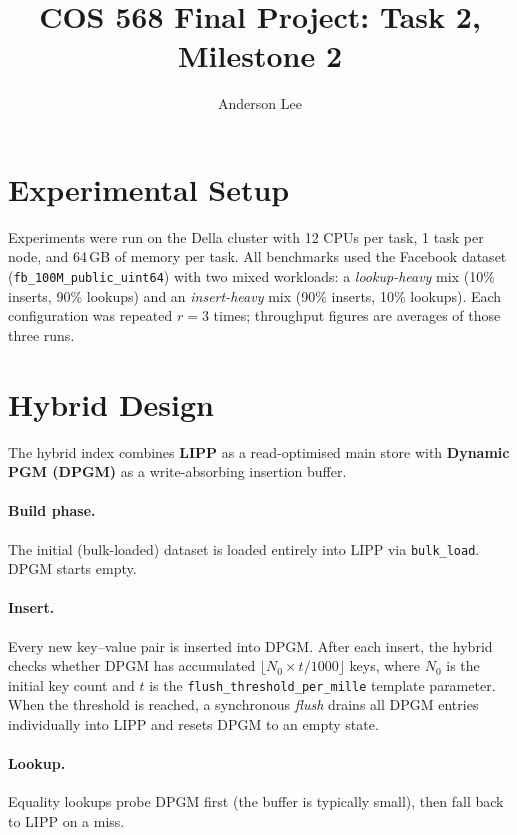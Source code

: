 \documentclass{MITcsail}
\title{COS 568 Final Project: Task 2, Milestone 2}
\author{Anderson Lee}
\begin{document}
\maketitle
\thispagestyle{firstpagestyle}

\section{Experimental Setup}
Experiments were run on the Della cluster with 12 CPUs per task, 1 task per
node, and 64\,GB of memory per task.  All benchmarks used the Facebook dataset
(\texttt{fb\_100M\_public\_uint64}) with two mixed workloads: a
\emph{lookup-heavy} mix (10\% inserts, 90\% lookups) and an
\emph{insert-heavy} mix (90\% inserts, 10\% lookups).  Each configuration was
repeated $r{=}3$ times; throughput figures are averages of those three runs.

\section{Hybrid Design}
The hybrid index combines \textbf{LIPP} as a read-optimised main store with
\textbf{Dynamic PGM (DPGM)} as a write-absorbing insertion buffer.

\paragraph{Build phase.}
The initial (bulk-loaded) dataset is loaded entirely into LIPP via
\texttt{bulk\_load}.  DPGM starts empty.

\paragraph{Insert.}
Every new key--value pair is inserted into DPGM.  After each insert, the
hybrid checks whether DPGM has accumulated
$\lfloor N_0 \times t / 1000 \rfloor$ keys, where $N_0$ is the initial key
count and $t$ is the \texttt{flush\_threshold\_per\_mille} template
parameter.  When the threshold is reached, a synchronous \emph{flush}
drains all DPGM entries individually into LIPP and resets DPGM to an empty
state.

\paragraph{Lookup.}
Equality lookups probe DPGM first (the buffer is typically small), then fall
back to LIPP on a miss.
\end{document}
